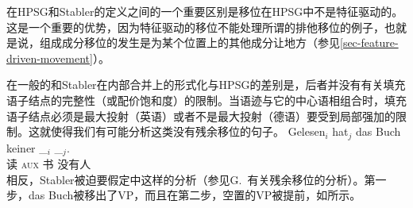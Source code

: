在HPSG和Stabler的定义之间的一个重要区别是移位在HPSG中不是特征驱动的。这是一个重要的优势，因为特征驱动的移位不能处理所谓的排他移位\citep{Fanselow2003b}的例子，也就是说，组成成分移位的发生是为某个位置上的其他成分让地方（参见\ref{sec-feature-driven-movement}）。

在一般的\xbartc 和Stabler在内部合并上的形式化与HPSG的差别是，后者并没有有关填充语子结点的完整性（或配价饱和度）的限制。当语迹与它的中心语相组合时，填充语子结点必须是最大投射（英语）或者不是最大投射（德语）要受到局部强加的限制。这就使得我们有可能分析这类没有残余移位的句子。
\addlines[2]
\ea
\gll Gelesen$_i$ hat$_j$ das Buch keiner \_$_i$ \_$_j$.\\
        读 \textsc{aux}  书 没有人\\
\z
相反，Stabler被迫要假定中这样的分析（参见G.\ 
 有关残余移位的分析）。第一步，das Buch被移出了VP，而且在第二步，空置的VP被提前，如所示。
